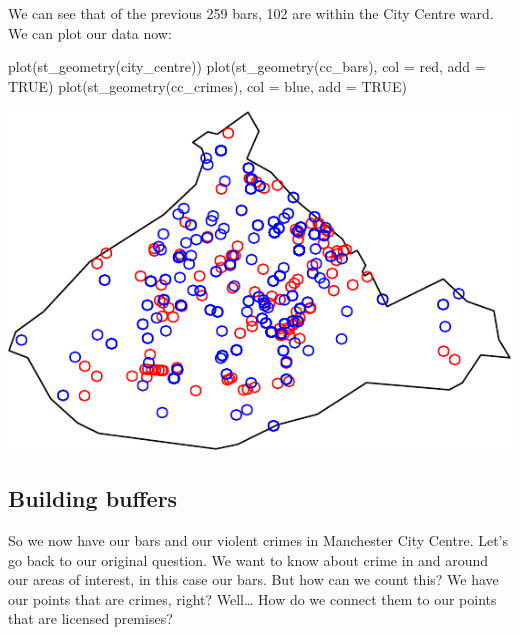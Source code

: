 \documentclass[
]{book}
\newenvironment{Shaded}{\begin{snugshade}}{\end{snugshade}}
\newcommand{\AttributeTok}[1]{\textcolor[rgb]{0.77,0.63,0.00}{#1}}
\newcommand{\ConstantTok}[1]{\textcolor[rgb]{0.00,0.00,0.00}{#1}}
\newcommand{\FunctionTok}[1]{\textcolor[rgb]{0.00,0.00,0.00}{#1}}
\newcommand{\NormalTok}[1]{#1}
\newcommand{\StringTok}[1]{\textcolor[rgb]{0.31,0.60,0.02}{#1}}
\begin{document}
We can see that of the previous 259 bars, 102 are within the City Centre ward. We can plot our data now:

\begin{Shaded}
\begin{Highlighting}[]
\FunctionTok{plot}\NormalTok{(}\FunctionTok{st\_geometry}\NormalTok{(city\_centre))}
\FunctionTok{plot}\NormalTok{(}\FunctionTok{st\_geometry}\NormalTok{(cc\_bars), }\AttributeTok{col =} \StringTok{\textquotesingle{}red\textquotesingle{}}\NormalTok{, }\AttributeTok{add =} \ConstantTok{TRUE}\NormalTok{)}
\FunctionTok{plot}\NormalTok{(}\FunctionTok{st\_geometry}\NormalTok{(cc\_crimes), }\AttributeTok{col =} \StringTok{\textquotesingle{}blue\textquotesingle{}}\NormalTok{, }\AttributeTok{add =} \ConstantTok{TRUE}\NormalTok{)}
\end{Highlighting}
\end{Shaded}

\includegraphics{crime_mapping_files/figure-latex/plot_bars_crimes-1.pdf}

\hypertarget{building-buffers}{%
\subsection{Building buffers}\label{building-buffers}}

So we now have our bars and our violent crimes in Manchester City Centre. Let's go back to our original question. We want to know about crime in and around our areas of interest, in this case our bars. But how can we count this? We have our points that are crimes, right? Well\ldots{} How do we connect them to our points that are licensed premises?
\end{document}
